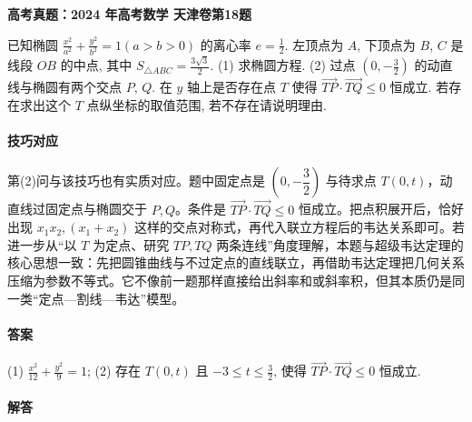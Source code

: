 \documentclass[UTF8,a4paper,11pt]{ctexart}
\newenvironment{gaokao}[1]{\par\medskip\noindent\textbf{高考真题：#1}\par\smallskip}{\par\medskip}
\begin{document}
\begin{gaokao}{2024 年高考数学 天津卷第18题}

已知椭圆 $\frac{x^2}{a^2}+\frac{y^2}{b^2}=1(a>b>0)$ 的离心率 $e=\frac{1}{2}$. 左顶点为 $A$, 下顶点为 $B$, $C$ 是线段 $OB$ 的中点, 其中 $S_{\triangle ABC}=\frac{3\sqrt{3}}{2}$.
(1) 求椭圆方程.
(2) 过点 $(0,-\frac{3}{2})$ 的动直线与椭圆有两个交点 $P$, $Q$. 在 $y$ 轴上是否存在点 $T$ 使得 $\overrightarrow{TP}\cdot\overrightarrow{TQ}\leq 0$ 恒成立. 若存在求出这个 $T$ 点纵坐标的取值范围, 若不存在请说明理由.

\paragraph{技巧对应}

第(2)问与该技巧也有实质对应。题中固定点是 $\left(0,-\dfrac{3}{2}\right)$ 与待求点 $T(0,t)$，动直线过固定点与椭圆交于 $P,Q$。条件是 $\overrightarrow{TP}\cdot\overrightarrow{TQ}\le 0$ 恒成立。把点积展开后，恰好出现 $x_1x_2,(x_1+x_2)$ 这样的交点对称式，再代入联立方程后的韦达关系即可。若进一步从“以 $T$ 为定点、研究 $TP,TQ$ 两条连线”角度理解，本题与超级韦达定理的核心思想一致：先把圆锥曲线与不过定点的直线联立，再借助韦达定理把几何关系压缩为参数不等式。它不像前一题那样直接给出斜率和或斜率积，但其本质仍是同一类“定点—割线—韦达”模型。

\paragraph{答案}

(1) $\frac{x^2}{12}+\frac{y^2}{9}=1$; (2) 存在 $T(0,t)$ 且 $-3\leq t\leq \frac{3}{2}$, 使得 $\overrightarrow{TP}\cdot\overrightarrow{TQ}\leq 0$ 恒成立.

\paragraph{解答}


\end{gaokao}
\end{document}
